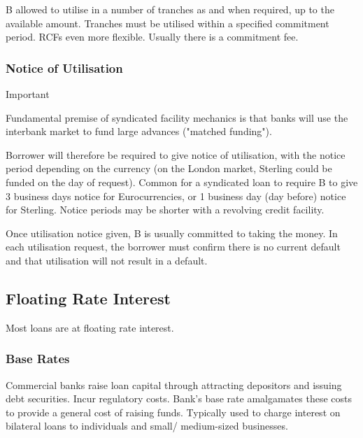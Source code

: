 \documentclass[
]{article}
\newenvironment{env-d797b130-4ec5-4d02-9c44-4f2a86698248}
{
    \savenotes\tcolorbox[blanker,breakable,left=5pt,borderline west={2pt}{-4pt}{cyan}]
}
{
    \endtcolorbox\spewnotes
}
\begin{document}
B allowed to utilise in a number of tranches as and when required, up to
the available amount. Tranches must be utilised within a specified
commitment period. RCFs even more flexible. Usually there is a
commitment fee.

\hypertarget{notice-of-utilisation}{%
\subsubsection{Notice of Utilisation}\label{notice-of-utilisation}}

\begin{env-d797b130-4ec5-4d02-9c44-4f2a86698248}

Important

Fundamental premise of syndicated facility mechanics is that banks will
use the interbank market to fund large advances ("matched funding").

\end{env-d797b130-4ec5-4d02-9c44-4f2a86698248}

Borrower will therefore be required to give notice of utilisation, with
the notice period depending on the currency (on the London market,
Sterling could be funded on the day of request). Common for a syndicated
loan to require B to give 3 business days notice for Eurocurrencies, or
1 business day (day before) notice for Sterling. Notice periods may be
shorter with a revolving credit facility.

Once utilisation notice given, B is usually committed to taking the
money. In each utilisation request, the borrower must confirm there is
no current default and that utilisation will not result in a default.

\hypertarget{floating-rate-interest}{%
\subsection{Floating Rate Interest}\label{floating-rate-interest}}

Most loans are at floating rate interest.

\hypertarget{base-rates}{%
\subsubsection{Base Rates}\label{base-rates}}

Commercial banks raise loan capital through attracting depositors and
issuing debt securities. Incur regulatory costs. Bank's base rate
amalgamates these costs to provide a general cost of raising funds.
Typically used to charge interest on bilateral loans to individuals and
small/ medium-sized businesses.
\end{document}
